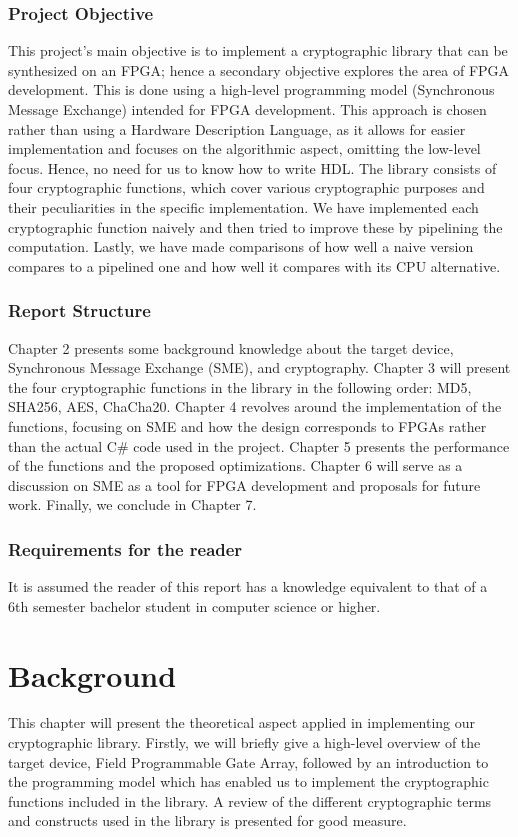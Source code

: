 \documentclass[a4paper, openany]{memoir}
\begin{document}
\begin{abstact}
\subsection{Project Objective}
\label{sec:orge67b80c}
This project's main objective is to implement a cryptographic library that can be synthesized on an FPGA; hence a secondary objective explores the area of FPGA development. This is done using a high-level programming model (Synchronous Message Exchange) intended for FPGA development. This approach is chosen rather than using a Hardware Description Language, as it allows for easier implementation and focuses on the algorithmic aspect, omitting the low-level focus. Hence, no need for us to know how to write HDL. The library consists of four cryptographic functions, which cover various cryptographic purposes and their peculiarities in the specific implementation. We have implemented each cryptographic function naively and then tried to improve these by pipelining the computation. Lastly, we have made comparisons of how well a naive version compares to a pipelined one and how well it compares with its CPU alternative.

\subsection{Report Structure}
\label{sec:orgb6158e4}
Chapter 2 presents some background knowledge about the target device, Synchronous Message Exchange (SME), and cryptography. Chapter 3 will present the four cryptographic functions in the library in the following order: MD5, SHA256, AES, ChaCha20. Chapter 4 revolves around the implementation of the functions, focusing on SME and how the design corresponds to FPGAs rather than the actual C\# code used in the project. Chapter 5 presents the performance of the functions and the proposed optimizations. Chapter 6 will serve as a discussion on SME as a tool for FPGA development and proposals for future work. Finally, we conclude in Chapter 7.

\subsection{Requirements for the reader}
\label{sec:orgb410d3a}
It is assumed the reader of this report has a knowledge equivalent to that of a 6th semester bachelor student in computer science or higher.

\chapter{Background}
\label{sec:org3282b6e}
This chapter will present the theoretical aspect applied in implementing our cryptographic library. Firstly, we will briefly give a high-level overview of the target device, Field Programmable Gate Array, followed by an introduction to the programming model which has enabled us to implement the cryptographic functions included in the library. A review of the different cryptographic terms and constructs used in the library is presented for good measure.


\end{abstact}
\end{document}
